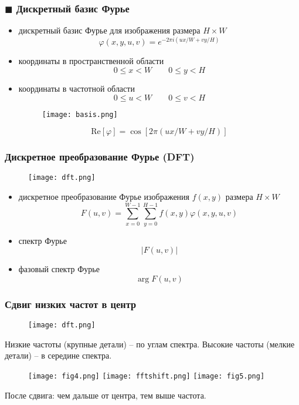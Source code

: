 \documentclass[
    12pt, 
    usepdftitle=false,
    aspectratio=1610
]{beamer}
\begin{document}
\begin{frame}
\frametitle{$\blacksquare$ Дискретный базис Фурье}
\begin{itemize}
    \item дискретный базис Фурье для изображения размера $H\times W$
    $$
        \varphi(x, y, u, v) = e^{-2\pi i(ux/W+vy/H)}
    $$
    \item координаты в пространственной области
    $$
        0\leqslant x< W\qquad
        0\leqslant y< H
    $$
    \item координаты в частотной области
    $$
        0\leqslant u< W\qquad
        0\leqslant v< H
    $$
    \begin{figure}
        \centering
        \texttt{[image: basis.png]}
    \end{figure}
    $$
        \mathrm{Re}[\varphi]=\cos\left[2\pi(ux/W+vy/H)\right]
    $$
\end{itemize}
\end{frame}

\begin{frame}
\frametitle{Дискретное преобразование Фурье (DFT)}
\begin{figure}
    \centering
    \texttt{[image: dft.png]}
\end{figure}
\begin{itemize}
    \item дискретное преобразование Фурье изображения $f(x,y)$ размера $H\times W$
    $$
        F(u, v)=\sum_{x=0}^{W-1}\sum_{y=0}^{H-1}
        f(x,y)\varphi(x,y,u,v)
    $$
    \item спектр Фурье
    $$
        |F(u, v)|
    $$
    \item фазовый спектр Фурье
    $$
        \arg F(u, v)
    $$
\end{itemize}
\end{frame}

\begin{frame}
    \frametitle{Сдвиг низких частот в центр}
    \begin{figure}
        \centering
        \texttt{[image: dft.png]}
    \end{figure}
    Низкие частоты (крупные детали) -- по углам спектра. 
    Высокие частоты (мелкие детали) -- в середине спектра.
    \begin{figure}
        \centering
        \texttt{[image: fig4.png]}
        \texttt{[image: fftshift.png]}
        \texttt{[image: fig5.png]}
    \end{figure}
    После сдвига: чем дальше от центра, тем выше частота.
\end{frame}
\end{document}

